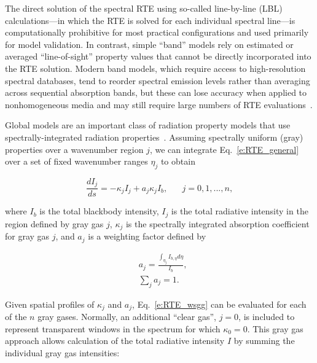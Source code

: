 \documentclass[preprint,12pt]{elsarticle}
\newcounter{bla}
\begin{document}
    The direct solution of the spectral RTE using so-called line-by-line (LBL) calculations---in which the RTE is solved
    for each individual spectral line---is computationally prohibitive for most practical configurations and used
    primarily for model validation. In contrast, simple ``band'' models rely on estimated or averaged ``line-of-sight''
    property values that cannot be directly incorporated into the RTE solution.
    Modern band models, which require access to high-resolution spectral databases, tend to reorder spectral emission
    levels rather than averaging across sequential absorption bands, but these can lose accuracy when applied to
    nonhomogeneous media and may still require large numbers of RTE evaluations~\citep{Modest_2016}.

    Global models are an important class of radiation property models that use spectrally-integrated radiation
    properties~\cite{Hottel_1967,Modest_2013,Modest_2016}. Assuming spectrally uniform (gray) properties over a
    wavenumber region $j$, we can integrate Eq.~\ref{e:RTE_general} over a set of fixed wavenumber ranges $\eta_j$ to
    obtain
%
    \begin{linenomath}
        \begin{equation}
            \label{e:RTE_wsgg}
            \frac{dI_j}{ds} = -\kappa_jI_j + a_j\kappa_jI_b, \hspace{20pt} j=0,1,...,n,
        \end{equation}
    \end{linenomath}
%
    where $I_b$ is the total blackbody intensity, $I_j$ is the total radiative intensity in the region defined by gray
    gas $j$, $\kappa_j$ is the spectrally integrated absorption coefficient for gray gas $j$, and $a_j$ is a weighting factor defined by
%
    \begin{linenomath}
        \begin{align}
            &a_j= \frac{\int_{\eta_j}I_{b,\eta}d\eta}{I_b},\\
            &\sum_j a_j = 1.
        \end{align}
    \end{linenomath}
%
    Given spatial profiles of $\kappa_j$ and $a_j$, Eq.~\ref{e:RTE_wsgg} can be evaluated for each of the $n$ gray
    gases. Normally, an additional ``clear gas'', $j=0$, is included to represent transparent windows in the
    spectrum for which $\kappa_0=0$. This gray gas approach allows calculation of the total radiative intensity $I$
    by summing the individual gray gas intensities:
\end{document}
